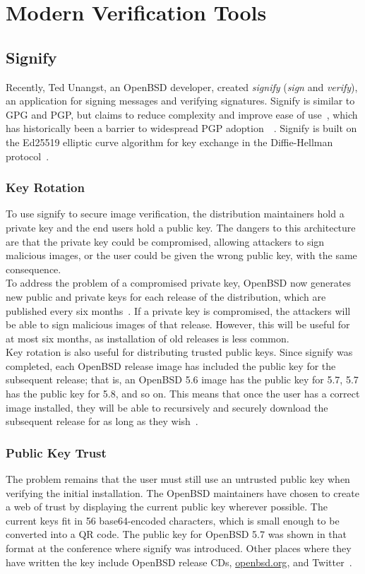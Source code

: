 \documentclass[conference]{IEEEtran}
\begin{document}
\section{Modern Verification Tools}

\subsection{Signify\label{signify}}

Recently, Ted Unangst, an OpenBSD developer, created \emph{signify} (\emph{sign} and
\emph{verify}), an application for signing messages and verifying signatures. Signify is
similar to GPG and PGP, but claims to reduce complexity and improve ease of use~\cite{signify},
which has historically been a barrier to widespread PGP adoption~\cite{whitten1999johnny}~\cite{sheng2006johnny}.
Signify is built on the Ed25519 elliptic curve algorithm for key exchange in the
Diffie-Hellman protocol~\cite{signify}.

\subsubsection{Key Rotation}
To use signify to secure image verification, the distribution maintainers hold a private
key and the end users hold a public key. The dangers to this architecture are that the
private key could be compromised, allowing attackers to sign malicious images, or the user
could be given the wrong public key, with the same consequence.\\
\indent To address the problem of a compromised private key, OpenBSD now generates new
public and private keys for each release of the distribution, which are published every
six months~\cite{openbsdrelease}. If a private key is compromised, the attackers will be able
to sign malicious images of that release. However, this will be useful for at most six months,
as installation of old releases is less common.\\
\indent Key rotation is also useful for distributing trusted public keys. Since signify was
completed, each OpenBSD release image has included the public key for the subsequent release;
that is, an OpenBSD 5.6 image has the public key for 5.7, 5.7 has the public key for 5.8, and
so on. This means that once the user has a correct image installed, they will be able to
recursively and securely download the subsequent release for as long as they wish~\cite{signify}.
\subsubsection{Public Key Trust\label{publickeytrust}}
The problem remains that the user must still use an untrusted public key when verifying the
initial installation. The OpenBSD maintainers have chosen to create a web of trust by displaying
the current public key wherever possible. The current keys fit in 56 base64-encoded characters,
which is small enough to be converted into a QR code. The public key for OpenBSD 5.7 was shown
in that format at the conference where signify was introduced. Other places where they have
written the key include OpenBSD release CDs, \url{openbsd.org}, and Twitter~\cite{signify}.
\end{document}
